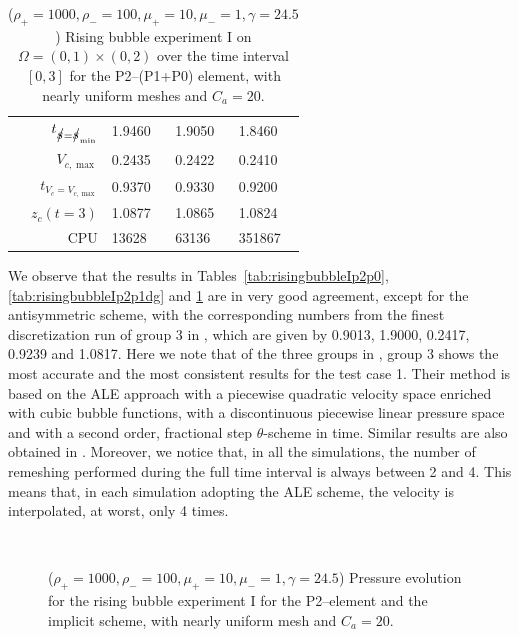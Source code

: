 \begin{table}
\begin{tabular}{rlll}
$t_{\strikes = \strikes_{\min}}$ & 1.9460 & 1.9050 & 1.8460 \\
$V_{c,\max}$                     & 0.2435 & 0.2422 & 0.2410 \\
$t_{V_c = V_{c,\max}}$           & 0.9370 & 0.9330 & 0.9200 \\
$z_c(t=3)$                       & 1.0877 & 1.0865 & 1.0824 \\
CPU                              &  13628 &  63136 & 351867 \\
\hline
\end{tabular}
\hspace*{-3.25cm}
\caption[Navier--Stokes rising bubble I benchmark values P2--(P1+P0)]
{($\rho_+ = 1000,\rho_- = 100,\mu_+ = 10,\mu_- =1,\gamma = 24.5$)
Rising bubble experiment I on ${\Omega = (0,1) \times (0,2)}$ over the time
interval $[0,3]$ for the P2--(P1+P0) element, with nearly uniform meshes and
$C_a=20$\textdegree.}
\label{tab:risingbubbleIp2p1p0}
\end{table}
We observe that the results in Tables~\ref{tab:risingbubbleIp2p0},
\ref{tab:risingbubbleIp2p1dg} and \ref{tab:risingbubbleIp2p1p0} are in very
good agreement, except for the antisymmetric scheme, with the corresponding
numbers from the finest discretization run of group 3 in \cite{HysingTKPBGT09},
which are given by 0.9013, 1.9000, 0.2417, 0.9239 and 1.0817. Here we note that
of the three groups in \cite{HysingTKPBGT09}, group 3 shows the most accurate
and the most consistent results for the test case 1. Their method is based on
the ALE approach with a piecewise quadratic velocity space enriched with cubic
bubble functions, with a discontinuous piecewise linear pressure space and with
a second order, fractional step $\theta$-scheme in time. Similar results are
also obtained in \cite{fluidfbp}. Moreover, we notice that, in all the
simulations, the number of remeshing performed during the full time interval is
always between 2 and 4. This means that, in each simulation adopting the ALE
scheme, the velocity is interpolated, at worst, only 4 times.

\begin{figure}[htbp]
\centering
{}
\\
\caption[Navier--Stokes rising bubble I pressure]
{($\rho_+ = 1000,\rho_- = 100,\mu_+ = 10,\mu_- =1,\gamma = 24.5$)
Pressure evolution for the rising bubble experiment I for the P2--\pdg element
and the implicit scheme, with nearly uniform mesh and $C_a=20$\textdegree.}
\label{fig:risingbubbleIpressure}
\end{figure}

